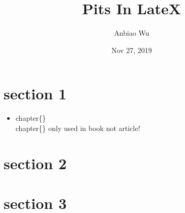 \documentclass{article}
\begin{document}
	\title{Pits In LateX}
	\author{Anbiao Wu}
	\date{Nov 27, 2019}
	\tableofcontents
	\maketitle

	
\section{section 1}
\begin{itemize}
\Large
	\item  chapter\{\} \\
	chapter\{\} only used in book not article!
	
\end{itemize}

\newpage	
\section{section 2}


\newpage
\section{section 3}


\newpage
\end{document}
